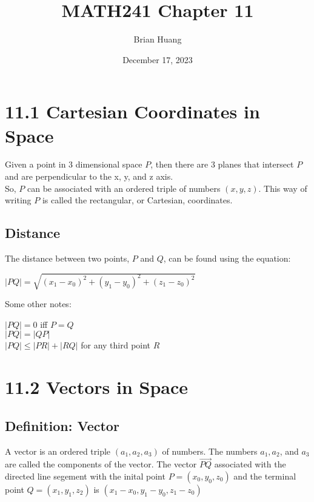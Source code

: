 \documentclass{article} %
\title{MATH241 Chapter 11} %
\author{Brian Huang} %
\date{December 17, 2023} %
\begin{document}
    \maketitle
    \newpage
    \section*{11.1 Cartesian Coordinates in Space} 
    
    Given a point in 3 dimensional space $P$, then there are 3 planes that intersect $P$
    and are perpendicular to the x, y, and z axis.
    \\
    So, $P$ can be associated with an ordered triple of numbers $(x,y,z)$.
    This way of writing $P$ is called the rectangular, or Cartesian, coordinates.
    \\
    \subsection*{Distance}
    The distance between two points, $P$ and $Q$, can be found using the equation:
    \begin{center}
        $|PQ| = \sqrt{(x_1-x_0)^2+(y_1-y_0)^2+(z_1-z_0)^2}$
        
    \end{center}
    Some other notes:
    \begin{center}
        $|PQ|=0$ iff $P=Q$\\
        $|PQ| = |QP|$\\
        $|PQ| \leq |PR|+|RQ|$ for any third point $R$
        
        
    \end{center}
    
\section*{11.2 Vectors in Space}

    \subsection*{Definition: Vector}
    A vector is an ordered triple $(a_1,a_2,a_3)$ of numbers. The numbers $a_1,a_2$, and $a_3$
    are called the components of the vector. The vector $\vec{PQ}$ associated with the directed
    line segement with the inital point $P = (x_0,y_0,z_0)$ and the terminal point $Q = (x_1,y_1,z_2)$
    is $(x_1-x_0,y_1-y_0,z_1-z_0)$
\end{document}

